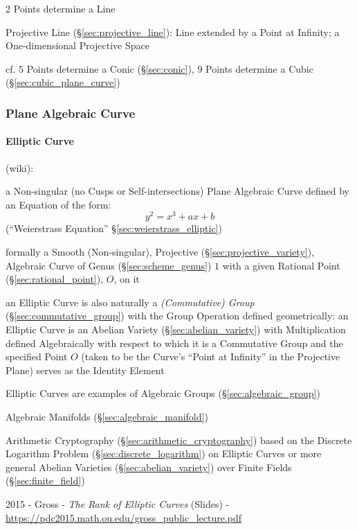 $2$ Points determine a Line

\fist Projective Line (\S\ref{sec:projective_line}): Line extended by a Point at
Infinity; a One-dimensional Projective Space

cf. $5$ Points determine a Conic (\S\ref{sec:conic}), $9$ Points determine a
Cubic (\S\ref{sec:cubic_plane_curve})



\subsubsection{Plane Algebraic Curve}\label{sec:plane_algebraic_curve}

\paragraph{Elliptic Curve}\label{sec:elliptic_curve}\hfill

(wiki):

a Non-singular (no Cusps or Self-intersections) Plane Algebraic Curve defined
by an Equation of the form:
\[
  y^2 = x^3 + ax + b
\]
(``Weierstrass Equation'' \S\ref{sec:weierstrass_elliptic})

formally a Smooth (Non-singular), Projective (\S\ref{sec:projective_variety}),
Algebraic Curve of Genus (\S\ref{sec:scheme_genus}) $1$ with a given Rational
Point (\S\ref{sec:rational_point}), $O$, on it

an Elliptic Curve is also naturally a \emph{(Commutative) Group}
(\S\ref{sec:commutative_group}) with the Group Operation defined geometrically:
an Elliptic Curve is an Abelian Variety (\S\ref{sec:abelian_variety}) with
Multiplication defined Algebraically with respect to which it is a Commutative
Group and the specified Point $O$ (taken to be the Curve's ``Point at Infinity''
in the Projective Plane) serves as the Identity Element

Elliptic Curves are examples of Algebraic Groups (\S\ref{sec:algebraic_group})

\fist Algebraic Manifolds (\S\ref{sec:algebraic_manifold})

\fist Arithmetic Cryptography (\S\ref{sec:arithmetic_cryptography}) based on
the Discrete Logarithm Problem (\S\ref{sec:discrete_logarithm}) on Elliptic
Curves or more general Abelian Varieties (\S\ref{sec:abelian_variety}) over
Finite Fields (\S\ref{sec:finite_field})

\asterism

2015 - Gross - \emph{The Rank of Elliptic Curves} (Slides) -
\url{https://pdc2015.math.ou.edu/gross_public_lecture.pdf}

